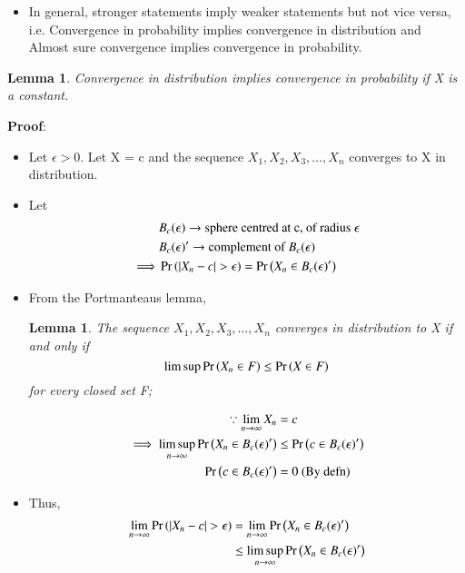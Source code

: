 \documentclass[journal,12pt,twocolumn]{IEEEtran}
\newtheorem{lemma}[theorem]{Lemma}
\begin{document}
\begin{itemize}
    \item In general, stronger statements imply weaker statements but not vice versa, i.e. Convergence in probability implies convergence in distribution and Almost sure convergence implies convergence in probability.
\end{itemize}
\begin{lemma} Convergence in distribution implies convergence in probability if X is a constant.\end{lemma}
    \textbf{Proof}:
    \begin{itemize}
        \item Let $\epsilon > 0$. Let X = c and the sequence $X_1,X_2,X_3, \dots ,X_n$ converges to X in distribution.
        \item Let \begin{align}
            &B_c( \epsilon ) \rightarrow \text{sphere centred at c, of radius } \epsilon \\
            &B_c( \epsilon)^\prime \rightarrow \text{complement of } B_c( \epsilon ) \\
            \implies &\pr{|X_n - c|>\epsilon} = \pr{X_ n\in B_c( \epsilon )^\prime}
        \end{align}
        \item From the Portmanteaus lemma,\begin{lemma}
             The sequence $X_1,X_2,X_3, \dots ,X_n$ converges in distribution to X if and only if \begin{equation}
                  \limsup \Pr\left(X_{n}\in F\right) \leq \Pr\left(X \in F\right)
             \end{equation} for every closed set F;
        \end{lemma} 
        \begin{align}
           \because \lim_{n \rightarrow \infty}X_n &= c \\
            \implies \limsup_{n \rightarrow \infty} \Pr\left(X_n \in B_c( \epsilon )^\prime\right) &\leq  \Pr\left(c \in B_c( \epsilon )^\prime\right) \\
            \Pr\left(c \in B_c( \epsilon )^\prime\right) &= 0 \text{ (By defn)}
        \end{align}
        \item Thus,
        \begin{align}
            \lim_{n \rightarrow \infty}\pr{|X_n - c|>\epsilon} &= \lim_{n \rightarrow \infty}\pr{X_n \in B_c( \epsilon )^\prime} \\
            & \leq \limsup_{n \rightarrow \infty}\pr{X_n \in B_c( \epsilon )^\prime} \\

\end{align}
\end{itemize}
\end{document}
